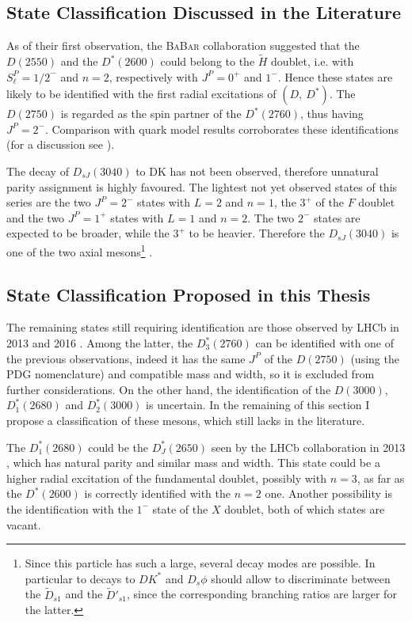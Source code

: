 \subsection{State Classification Discussed in the Literature}

As of their first observation, the \textsc{BaBar} collaboration suggested that the $D(2550)$ and the $D^*(2600)$ could belong to the $\tilde{H}$ doublet, i.e. with $S^P_\ell = \left. 1/2 \right.^-$ and $n = 2$, respectively with $J^P = 0^+$ and $1^-$. Hence these states are likely to be identified with the first radial excitations of $(D,\ D^*)$. The $D(2750)$ is regarded as the spin partner of the $D^*(2760)$, thus having $J^P = 2^-$. Comparison with quark model results corroborates these identifications (for a discussion see \cite{Colangelo:2012xi}).

The decay of $D_{sJ}(3040)$ to DK has not been observed, therefore unnatural parity assignment is highly favoured. The lightest not yet observed states of this series are the two $J^P = 2^-$ states with $L = 2$ and $n = 1$, the $3^+$ of the $F$ doublet and the two $J^P = 1^+$ states with $L = 1$ and $n = 2$. The two $2^-$ states are expected to be broader, while the $3^+$ to be heavier. Therefore the $D_{s J}(3040)$ is one of the two axial mesons\footnote{Since this particle has such a large, several decay modes are possible. In particular to decays to $D K^*$ and $D_s \phi$ should allow to discriminate between the $\tilde{D}_{s 1}$ and the $\tilde{D}'_{s 1}$, since the corresponding branching ratios are larger for the latter.} \cite{Colangelo:2010te}.

\subsection{State Classification Proposed in this Thesis}

The remaining states still requiring identification are those observed by LHCb in 2013 \cite{Aaij:2013sza} and 2016 \cite{Aaij:2016fma}. Among the latter, the $D_3^*(2760)$ can be identified with one of the previous observations, indeed it has the same $J^P$ of the $D(2750)$ (using the PDG nomenclature) and compatible mass and width, so it is excluded from further considerations. On the other hand, the identification of the $D(3000)$, $D_1^*(2680)$ and $D_2^*(3000)$ is uncertain. In the remaining of this section I propose a classification of these mesons, which still lacks in the literature.

The $D_1^*(2680)$ could be the $D^*_J(2650)$ seen by the LHCb collaboration in 2013 \cite{Aaij:2013sza}, which has natural parity and similar mass and width. This state could be a higher radial excitation of the fundamental doublet, possibly with $n = 3$, as far as the $D^*(2600)$ is correctly identified with the $n = 2$ one. Another possibility is the identification with the $1^-$ state of the $X$ doublet, both of which states are vacant. 

